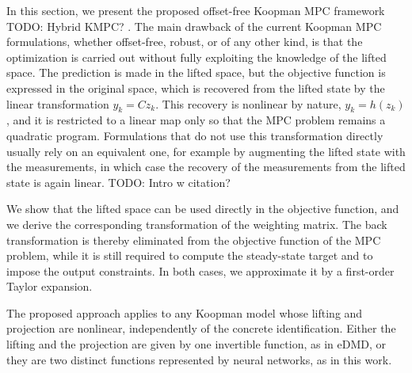 \documentclass[preprint,12pt,authoryear]{elsarticle}
\theoremstyle{remark}
\newcommand{\todo}[1]{{{\color{red} TODO: #1	}} }
\begin{document}
In this section, we present the proposed offset-free Koopman MPC framework\todo{Hybrid KMPC?}. The main drawback of the current Koopman MPC formulations, whether offset-free, robust, or of any other kind, is that the optimization is carried out without fully exploiting the knowledge of the lifted space.
The prediction is made in the lifted space, but the objective function is expressed in the original space, which is recovered from the lifted state by the linear transformation \(y_k = C z_k\). This recovery is nonlinear by nature, \(y_k = h(z_k)\), and it is restricted to a linear map only so that the MPC problem remains a quadratic program. Formulations that do not use this transformation directly usually rely on an equivalent one, for example by augmenting the lifted state with the measurements, in which case the recovery of the measurements from the lifted state is again linear.
\todo{Intro w citation?}

We show that the lifted space can be used directly in the objective function, and we derive the corresponding transformation of the weighting matrix.
The back transformation is thereby eliminated from the objective function of the MPC problem, while it is still required to compute the steady-state target and to impose the output constraints. In both cases, we approximate it by a first-order Taylor expansion.

The proposed approach applies to any Koopman model whose lifting and projection are nonlinear, independently of the concrete identification.
Either the lifting and the projection are given by one invertible function, as in eDMD, or they are two distinct functions represented by neural networks, as in this work.
\end{document}
